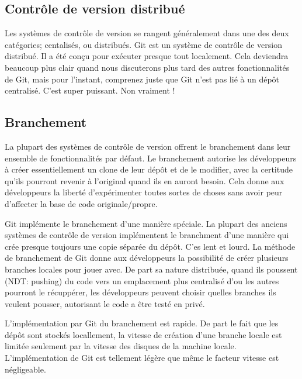 \subsection{Contrôle de version distribué}
Les systèmes de contrôle de version se rangent généralement dans une des deux catégories; centalisés, ou distribués.
Git est un système de contrôle de version distribué.
Il a été conçu pour exécuter presque tout localement.
Cela deviendra beaucoup plus clair quand nous discuterons plus tard des autres fonctionnalités de Git, mais pour l'instant, comprenez juste que Git n'est pas lié à un dépôt centralisé.
C'est super puissant.
Non vraiment !

\subsection{Branchement}
La plupart des systèmes de contrôle de version offrent le branchement dans leur ensemble de fonctionnalités par défaut. 
Le branchement autorise les développeurs à créer essentiellement un clone de leur dépôt et de le modifier, avec la certitude qu'ils pourront revenir à l'original quand ils en auront besoin.
Cela donne aux développeurs la liberté d'expérimenter toutes sortes de choses sans avoir peur d'affecter la base de code originale/propre.

Git implémente le branchement d'une manière spéciale.
La plupart des anciens systèmes de contrôle de version implémentent le branchment d'une manière qui crée presque toujours une copie séparée du dépôt.
C'es lent et lourd.
La méthode de branchement de Git donne aux développeurs la possibilité de créer plusieurs branches locales pour jouer avec.
De part sa nature distribuée, quand ils poussent (NDT: pushing) du code vers un emplacement plus centralisé d'ou les autres pourront le récuppérer, les développeurs peuvent choisir quelles branches ils veulent pousser, autorisant le code a être testé en privé.

L'implémentation par Git du branchement est rapide.
De part le fait que les dépôt sont stockés locallement, la vitesse de création d'une branche locale est limitée seulement par la vitesse des disques de la machine locale.
L'implémentation de Git est tellement légère que même le facteur vitesse est négligeable.

